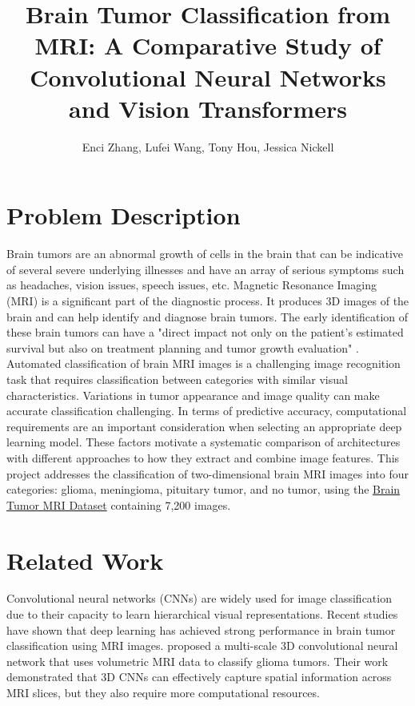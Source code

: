 \documentclass{article}
\title{Brain Tumor Classification from MRI: A Comparative Study of Convolutional Neural Networks and Vision Transformers}
\author{Enci Zhang, Lufei Wang, Tony Hou, Jessica Nickell}
\date{} %
\begin{document}
\maketitle
\section*{Problem Description}
Brain tumors are an abnormal growth of cells in the brain that can be indicative of several severe underlying illnesses and have an array of serious 
symptoms such as headaches, vision issues, speech issues, etc. Magnetic Resonance Imaging (MRI) is a significant part of the diagnostic process. 
It produces 3D images of the brain and can help identify and diagnose brain tumors. The early identification of these brain tumors can have a "direct 
impact not only on the patient's estimated survival but also on treatment planning and tumor growth evaluation" \citet{mzoughi2020}. Automated classification of brain 
MRI images is a challenging image recognition task that requires classification between categories with similar visual 
characteristics. Variations in tumor appearance and image quality can make accurate classification challenging. In terms of predictive accuracy, 
computational requirements are an important consideration when selecting an appropriate deep learning model. These factors motivate a systematic 
comparison of architectures with different approaches to how they extract and combine image features. This project addresses the classification of 
two-dimensional brain MRI images into four categories: glioma, meningioma, pituitary tumor, and no tumor, using the 
\href{https://www.kaggle.com/datasets/masoudnickparvar/brain-tumor-mri-dataset}{Brain Tumor MRI Dataset} containing 7,200 images.

\section*{Related Work}
Convolutional neural networks (CNNs) are widely used for image classification due to their capacity to learn hierarchical visual representations.
Recent studies have shown that deep learning has achieved strong performance in brain tumor classification using MRI images. 
\citet{mzoughi2020} proposed a multi-scale 3D convolutional neural network that uses volumetric MRI data to classify glioma tumors. 
Their work demonstrated that 3D CNNs can effectively capture spatial information across MRI slices, but they also require more computational 
resources. 
\end{document}
